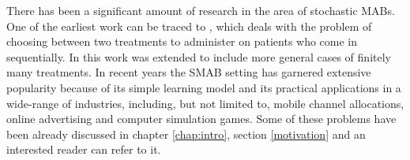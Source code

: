 There has been a significant amount of research in the area of stochastic MABs. One of the earliest work can be traced to \citet{thompson1933likelihood}, which deals with  the problem of choosing between two treatments to administer on patients who come in sequentially. In \citet{thompson1935theory} this work was extended to include more general cases of finitely many treatments. In recent years the SMAB setting has garnered extensive popularity because of its simple learning  model and its practical applications in a wide-range of industries, including, but not limited to, mobile channel allocations, online advertising and computer simulation games. Some of these problems have been already discussed in chapter \ref{chap:intro}, section \ref{motivation} and an interested reader can refer to it.
	